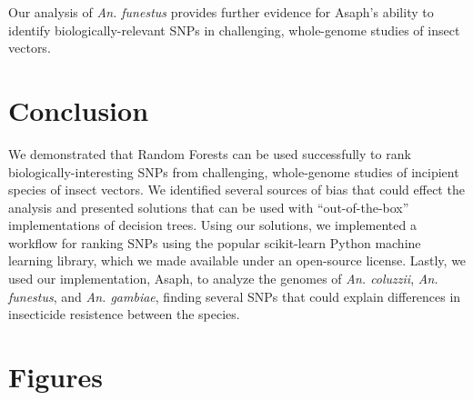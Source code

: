 Our analysis of \emph{An. funestus} provides further evidence for Asaph's ability to identify biologically-relevant SNPs in challenging, whole-genome studies of insect vectors.

\section{Conclusion}
We demonstrated that Random Forests can be used successfully to rank biologically-interesting SNPs from challenging, whole-genome studies of incipient species of insect vectors.  We identified several sources of bias that could effect the analysis and presented solutions that can be used with ``out-of-the-box'' implementations of decision trees.  Using our solutions, we implemented a workflow for ranking SNPs using the popular scikit-learn Python machine learning library, which we made available under an open-source license.  Lastly, we used our implementation, Asaph, to analyze the genomes of \emph{An. coluzzii}, \emph{An. funestus}, and \emph{An. gambiae}, finding several SNPs that could explain differences in insecticide resistence between the species.

\section{Figures}

